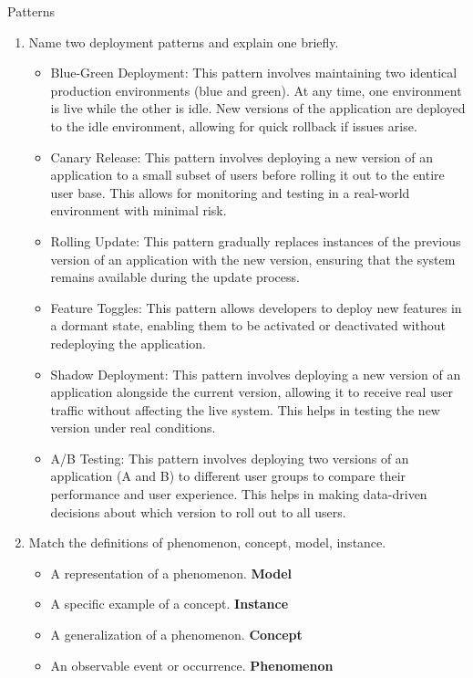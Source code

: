 \documentclass{article}
\begin{document}
\begin{exercise}{Patterns}
\begin{enumerate}
    \item Name two deployment patterns and explain one briefly. \begin{solution}
        \begin{itemize}
          \item Blue-Green Deployment: This pattern involves maintaining two identical production environments (blue and green). At any time, one environment is live while the other is idle. New versions of the application are deployed to the idle environment, allowing for quick rollback if issues arise.
          \item Canary Release: This pattern involves deploying a new version of an application to a small subset of users before rolling it out to the entire user base. This allows for monitoring and testing in a real-world environment with minimal risk.
          \item Rolling Update: This pattern gradually replaces instances of the previous version of an application with the new version, ensuring that the system remains available during the update process.
          \item Feature Toggles: This pattern allows developers to deploy new features in a dormant state, enabling them to be activated or deactivated without redeploying the application.
          \item Shadow Deployment: This pattern involves deploying a new version of an application alongside the current version, allowing it to receive real user traffic without affecting the live system. This helps in testing the new version under real conditions.
          \item A/B Testing: This pattern involves deploying two versions of an application (A and B) to different user groups to compare their performance and user experience. This helps in making data-driven decisions about which version to roll out to all users.
        \end{itemize}
      \end{solution}

    \item Match the definitions of phenomenon, concept, model, instance.
      \begin{itemize}
        \item A representation of a phenomenon. \textbf{Model}
        \item A specific example of a concept. \textbf{Instance}
        \item A generalization of a phenomenon. \textbf{Concept}
        \item An observable event or occurrence. \textbf{Phenomenon}
      \end{itemize}
  \end{enumerate}
\end{exercise}
\end{document}
